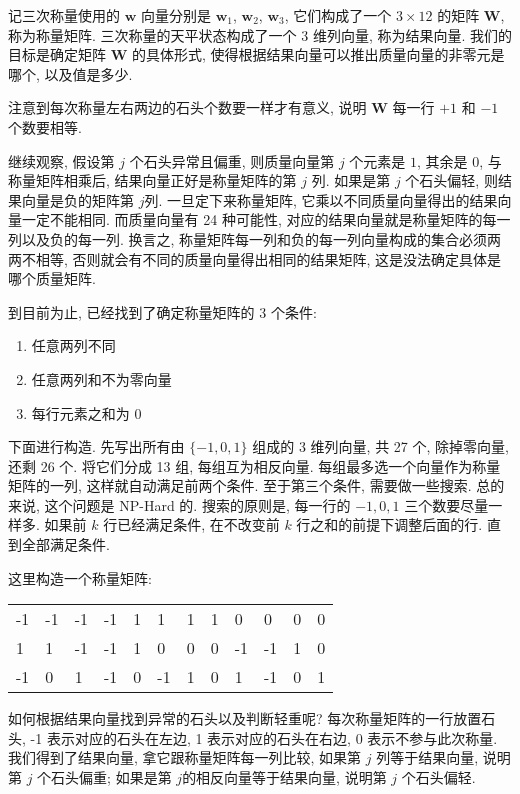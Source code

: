 记三次称量使用的 $ \boldsymbol{w} $ 向量分别是 $ \boldsymbol{w}_1 $, $ \boldsymbol{w}_2 $, $ \boldsymbol{w}_3 $, 它们构成了一个 $ 3\times 12 $ 的矩阵 $ \mathbf{W} $, 称为称量矩阵. 三次称量的天平状态构成了一个 3 维列向量, 称为结果向量. 我们的目标是确定矩阵 $ \mathbf{W} $ 的具体形式, 使得根据结果向量可以推出质量向量的非零元是哪个, 以及值是多少. 

注意到每次称量左右两边的石头个数要一样才有意义, 说明 $ \mathbf{W} $ 每一行 $+1$ 和 $-1$ 个数要相等.

继续观察, 假设第 $ j $ 个石头异常且偏重, 则质量向量第 $ j $ 个元素是 $ 1 $, 其余是 $0$, 与称量矩阵相乘后, 结果向量正好是称量矩阵的第 $ j $ 列. 如果是第 $ j $ 个石头偏轻, 则结果向量是负的矩阵第 $ j $列. 一旦定下来称量矩阵, 它乘以不同质量向量得出的结果向量一定不能相同. 而质量向量有 24 种可能性, 对应的结果向量就是称量矩阵的每一列以及负的每一列. 换言之, 称量矩阵每一列和负的每一列向量构成的集合必须两两不相等, 否则就会有不同的质量向量得出相同的结果矩阵, 这是没法确定具体是哪个质量矩阵.

到目前为止, 已经找到了确定称量矩阵的 3 个条件:
\begin{enumerate}
\item 任意两列不同
\item 任意两列和不为零向量
\item 每行元素之和为 0
\end{enumerate}

下面进行构造. 先写出所有由 $ \{-1,0,1\} $ 组成的 3 维列向量, 共 27 个, 除掉零向量, 还剩 26 个. 将它们分成 13 组, 每组互为相反向量. 每组最多选一个向量作为称量矩阵的一列, 这样就自动满足前两个条件. 至于第三个条件, 需要做一些搜索. 总的来说, 这个问题是 NP-Hard 的. 搜索的原则是, 每一行的 $-1, 0, 1$ 三个数要尽量一样多. 如果前 $ k $ 行已经满足条件, 在不改变前 $ k $ 行之和的前提下调整后面的行. 直到全部满足条件.

这里构造一个称量矩阵:
\begin{figure*}[htbp]
\centering
\setlength\extrarowheight{2pt}
\begin{tabular}{|l|l|l|l|l|l|l|l|l|l|l|l|}
\hline
-1 & -1 & -1 & -1 &  1 &  1 &  1 &  1 &  0 &  0 &  0 &  0\\
 1 &  1 & -1 & -1 &  1 &  0 &  0 &  0 & -1 & -1 &  1 &  0\\
-1 &  0 &  1 & -1 &  0 & -1 &  1 &  0 &  1 & -1 &  0 &  1 \\
\hline
\end{tabular}
\end{figure*}

如何根据结果向量找到异常的石头以及判断轻重呢? 每次称量矩阵的一行放置石头, -1 表示对应的石头在左边, 1 表示对应的石头在右边, 0 表示不参与此次称量. 我们得到了结果向量, 拿它跟称量矩阵每一列比较, 如果第 $ j $ 列等于结果向量, 说明第 $ j $ 个石头偏重; 如果是第 $ j $的相反向量等于结果向量, 说明第 $ j $ 个石头偏轻. 


